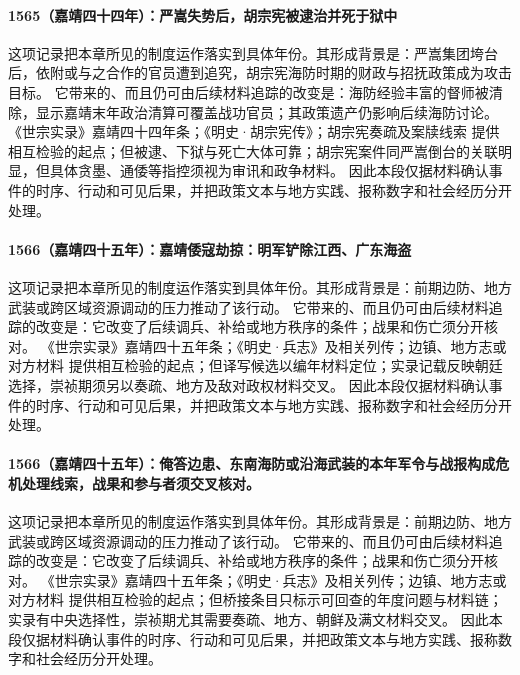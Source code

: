 \paragraph{1565（嘉靖四十四年）：严嵩失势后，胡宗宪被逮治并死于狱中} 这项记录把本章所见的制度运作落实到具体年份。其形成背景是：严嵩集团垮台后，依附或与之合作的官员遭到追究，胡宗宪海防时期的财政与招抚政策成为攻击目标。 它带来的、而且仍可由后续材料追踪的改变是：海防经验丰富的督师被清除，显示嘉靖末年政治清算可覆盖战功官员；其政策遗产仍影响后续海防讨论。 《世宗实录》嘉靖四十四年条；《明史·胡宗宪传》；胡宗宪奏疏及案牍线索 提供相互检验的起点；但被逮、下狱与死亡大体可靠；胡宗宪案件同严嵩倒台的关联明显，但具体贪墨、通倭等指控须视为审讯和政争材料。 因此本段仅据材料确认事件的时序、行动和可见后果，并把政策文本与地方实践、报称数字和社会经历分开处理。

\paragraph{1566（嘉靖四十五年）：嘉靖倭寇劫掠：明军铲除江西、广东海盗} 这项记录把本章所见的制度运作落实到具体年份。其形成背景是：前期边防、地方武装或跨区域资源调动的压力推动了该行动。 它带来的、而且仍可由后续材料追踪的改变是：它改变了后续调兵、补给或地方秩序的条件；战果和伤亡须分开核对。 《世宗实录》嘉靖四十五年条；《明史·兵志》及相关列传；边镇、地方志或对方材料 提供相互检验的起点；但译写候选以编年材料定位；实录记载反映朝廷选择，崇祯期须另以奏疏、地方及敌对政权材料交叉。 因此本段仅据材料确认事件的时序、行动和可见后果，并把政策文本与地方实践、报称数字和社会经历分开处理。

\paragraph{1566（嘉靖四十五年）：俺答边患、东南海防或沿海武装的本年军令与战报构成危机处理线索，战果和参与者须交叉核对。} 这项记录把本章所见的制度运作落实到具体年份。其形成背景是：前期边防、地方武装或跨区域资源调动的压力推动了该行动。 它带来的、而且仍可由后续材料追踪的改变是：它改变了后续调兵、补给或地方秩序的条件；战果和伤亡须分开核对。 《世宗实录》嘉靖四十五年条；《明史·兵志》及相关列传；边镇、地方志或对方材料 提供相互检验的起点；但桥接条目只标示可回查的年度问题与材料链；实录有中央选择性，崇祯期尤其需要奏疏、地方、朝鲜及满文材料交叉。 因此本段仅据材料确认事件的时序、行动和可见后果，并把政策文本与地方实践、报称数字和社会经历分开处理。

